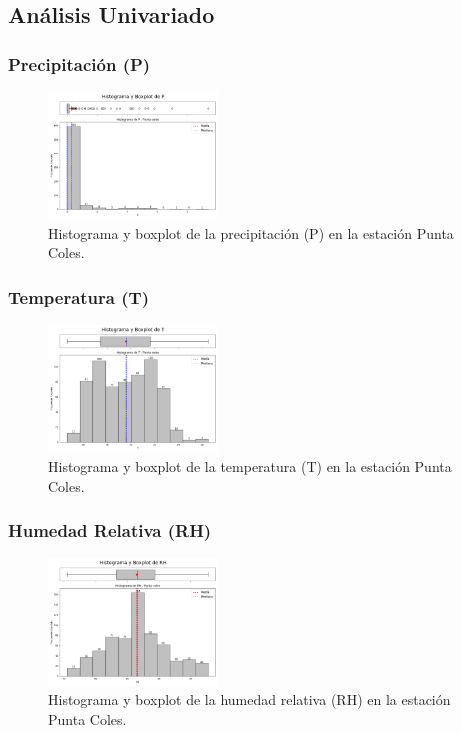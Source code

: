 \subsection{Análisis Univariado}

\subsubsection*{Precipitación (P)}
\begin{figure}[H]
\centering
\includegraphics[width=0.4\textwidth]{resultados/por_estacion_meteorologica/Punta_Coles/P_histograma.png}
\caption{Histograma y boxplot de la precipitación (P) en la estación Punta Coles.}
\label{fig:punta_coles_P}
\end{figure}

\subsubsection*{Temperatura (T)}
\begin{figure}[H]
\centering
\includegraphics[width=0.4\textwidth]{resultados/por_estacion_meteorologica/Punta_Coles/T_histograma.png}
\caption{Histograma y boxplot de la temperatura (T) en la estación Punta Coles.}
\label{fig:punta_coles_T}
\end{figure}

\subsubsection*{Humedad Relativa (RH)}
\begin{figure}[H]
\centering
\includegraphics[width=0.4\textwidth]{resultados/por_estacion_meteorologica/Punta_Coles/RH_histograma.png}
\caption{Histograma y boxplot de la humedad relativa (RH) en la estación Punta Coles.}
\label{fig:punta_coles_RH}
\end{figure}

